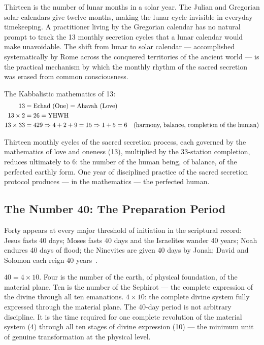 \documentclass[12pt, a4paper]{article}
\begin{document}
Thirteen is the number of lunar months in a solar year. The Julian and
Gregorian solar calendars give twelve months, making the lunar cycle invisible
in everyday timekeeping. A practitioner living by the Gregorian calendar has no
natural prompt to track the 13 monthly secretion cycles that a lunar calendar
would make unavoidable. The shift from lunar to solar calendar — accomplished
systematically by Rome across the conquered territories of the ancient world
— is the practical mechanism by which the monthly rhythm of the sacred
secretion was erased from common consciousness.

The Kabbalistic mathematics of 13:
\begin{align}
13 &= \text{Echad (One)} = \text{Ahavah (Love)} \notag \\
13 \times 2 &= 26 = \text{YHWH} \notag \\
13 \times 33 &= 429 \Rightarrow 4+2+9 = 15 \Rightarrow 1+5 = 6
\quad \text{(harmony, balance, completion of the human)} \notag
\end{align}

Thirteen monthly cycles of the sacred secretion process, each governed by the
mathematics of love and oneness (13), multiplied by the 33-station completion,
reduces ultimately to 6: the number of the human being, of balance, of the
perfected earthly form. One year of disciplined practice of the sacred secretion
protocol produces — in the mathematics — the perfected human.

\subsection{The Number 40: The Preparation Period}

Forty appears at every major threshold of initiation in the scriptural record:
Jesus fasts 40 days; Moses fasts 40 days and the Israelites wander 40 years;
Noah endures 40 days of flood; the Ninevites are given 40 days by Jonah; David
and Solomon each reign 40 years~\autocite{westcott1911}.

$40 = 4 \times 10$. Four is the number of the earth, of physical foundation,
of the material plane. Ten is the number of the Sephirot — the complete
expression of the divine through all ten emanations. $4 \times 10$: the
complete divine system fully expressed through the material plane. The 40-day
period is not arbitrary discipline. It is the time required for one complete
revolution of the material system (4) through all ten stages of divine
expression (10) — the minimum unit of genuine transformation at the physical
level.
\end{document}
